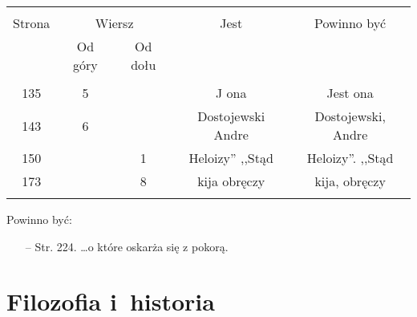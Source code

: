 \documentclass[a4paper,11pt]{article}
\begin{document}
\vspace{\spaceTwo}







%
%
%

\begin{center}
  \begin{tabular}{|c|c|c|c|c|}
    \hline
    & \multicolumn{2}{c|}{} & & \\
    Strona & \multicolumn{2}{c|}{Wiersz} & Jest
                              & Powinno być \\ \cline{2-3}
    & Od góry & Od dołu & & \\
    \hline
    & & & & \\
    135 & 5 & & J ona & Jest ona \\
    143 & 6 & & Dostojewski Andre & Dostojewski, Andre \\
    150 & & 1 & Heloizy'' ,,Stąd  %
           & Heloizy''. ,,Stąd \\  %
    173 & & 8 & kija obręczy & kija, obręczy \\
    & & & & \\ \hline
  \end{tabular}
\end{center}

Powinno być:
\begin{itemize}
\item[--] Str. 224. \ldots o które oskarża się z pokorą.
\end{itemize}





\newpage
\section{Filozofia i~historia}

\vspace{\spaceTwo}



\end{document}
